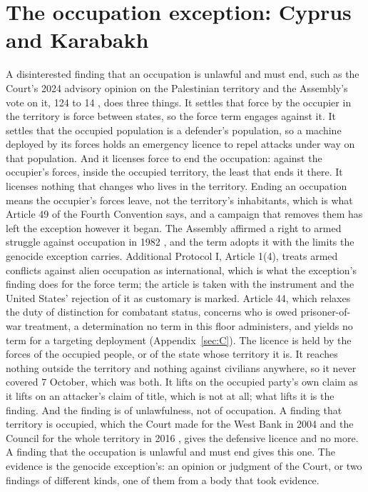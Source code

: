 \section{The occupation exception: Cyprus and Karabakh}
\label{sec:G.5}
A disinterested finding that an occupation is unlawful and must end, such as the Court's 2024 advisory opinion on the Palestinian territory \autocite{icj2024palestine} and the Assembly's vote on it, 124 to 14 \autocite{unga2024es1024}, does three things. It settles that force by the occupier in the territory is force between states, so the force term engages against it. It settles that the occupied population is a defender's population, so a machine deployed by its forces holds an emergency licence to repel attacks under way on that population. And it licenses force to end the occupation: against the occupier's forces, inside the occupied territory, the least that ends it there. It licenses nothing that changes who lives in the territory. Ending an occupation means the occupier's forces leave, not the territory's inhabitants, which is what Article 49 of the Fourth Convention says, and a campaign that removes them has left the exception however it began. The Assembly affirmed a right to armed struggle against occupation in 1982 \autocite{unga1982res3743}, and the term adopts it with the limits the genocide exception carries. Additional Protocol I, Article 1(4), treats armed conflicts against alien occupation as international, which is what the exception's finding does for the force term; the article is taken with the instrument and the United States' rejection of it as customary is marked. Article 44, which relaxes the duty of distinction for combatant status, concerns who is owed prisoner-of-war treatment, a determination no term in this floor administers, and yields no term for a targeting deployment (Appendix~\ref{sec:C}). The licence is held by the forces of the occupied people, or of the state whose territory it is. It reaches nothing outside the territory and nothing against civilians anywhere, so it never covered 7 October, which was both. It lifts on the occupied party's own claim as it lifts on an attacker's claim of title, which is not at all; what lifts it is the finding. And the finding is of unlawfulness, not of occupation. A finding that territory is occupied, which the Court made for the West Bank in 2004 \autocite{icj2004wall} and the Council for the whole territory in 2016 \autocite{unsc2016res2334}, gives the defensive licence and no more. A finding that the occupation is unlawful and must end gives this one. The evidence is the genocide exception's: an opinion or judgment of the Court, or two findings of different kinds, one of them from a body that took evidence.

